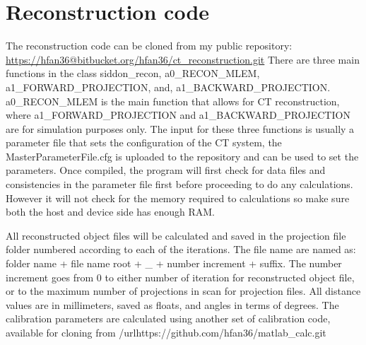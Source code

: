 \chapter{Reconstruction code}
The reconstruction code can be cloned from my public repository: \url{https://hfan36@bitbucket.org/hfan36/ct_reconstruction.git}
There are three main functions in the class siddon_recon, a0_RECON_MLEM, a1_FORWARD_PROJECTION, and, a1_BACKWARD_PROJECTION.  a0_RECON_MLEM is the main function that allows for CT reconstruction, where a1_FORWARD_PROJECTION and a1_BACKWARD_PROJECTION are for simulation purposes only.  The input for these three functions is usually a parameter file that sets the configuration of the CT system, the MasterParameterFile.cfg is uploaded to the repository and can be used to set the parameters.  Once compiled, the program will first check for data files and consistencies in the parameter file first before proceeding to do any calculations.  However it will not check for the memory required to calculations so make sure both the host and device side has enough RAM.  

All reconstructed object files will be calculated and saved in the projection file folder numbered according to each of the iterations.  The file name are named as:
folder name + file name root + _ + number increment + suffix.  The number increment goes from 0 to either number of iteration for reconstructed object file, or to the maximum number of projections in scan for projection files.  All distance values are in millimeters, saved as floats, and angles in terms of degrees.  The calibration parameters are calculated using another set of calibration code, available for cloning from /url{https://github.com/hfan36/matlab_calc.git}